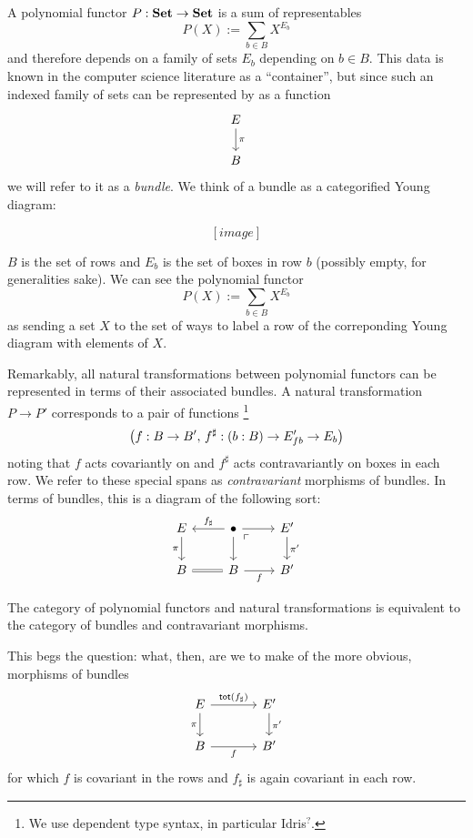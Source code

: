 
A polynomial functor $P : \operatorname{\textbf{Set}} \to \operatorname{\textbf{Set}}$ is a sum of representables
$$P(X) := \sum_{b \in B} X^{E_b}$$
and therefore depends on a family of sets $E_b$ depending on $b\in B$. This data is known
in the computer science literature as a ``container'', but since such an indexed
family of sets can be represented by as a function
\[
  \begin{tikzcd}
    E \arrow[d, "\pi"] \\
    B
  \end{tikzcd}
\]
we will refer to it as a \emph{bundle}. We think of a bundle as a categorified
Young diagram:

\[
[image]
\]

$B$ is the set of rows and $E_b$ is the set of boxes in row $b$ (possibly empty,
for generalities sake). We can see the polynomial functor
\begin{equation}\label{eqn.poly}
P(X) := \sum_{b \in B} X^{E_b}
\end{equation}
as sending a set $X$ to the set of ways to label a row of the correponding Young
diagram with elements of $X$.

Remarkably, all natural transformations between polynomial functors can be
represented in terms of their associated bundles. A natural transformation $P
\to P'$ corresponds to a pair of functions%
\footnote{We use dependent type syntax, in particular Idris$^?$.}
\[
\left( f : B \to B',\, f^{\sharp} : ({b : B}) \to E'_{fb} \to E_b \right)
\]
noting that $f$ acts covariantly on  and $f^\sharp$ acts contravariantly on
boxes in each row. We refer to these special spans as  \emph{contravariant} morphisms of bundles.
In terms of bundles, this is a diagram of the following sort:
\[
  \begin{tikzcd}
    E \arrow[d, "\pi"'] \arrow[r, leftarrow, "f_{\sharp}"] & \bullet \arrow[d] \arrow[r]
    \arrow[dr, phantom, "\ulcorner" very near start] & E' \arrow[d, "\pi'"] \\
    B \arrow[r, equals] & B \arrow[r, "f"'] & B'
  \end{tikzcd}
\]

\begin{thm}[cite]
The category of polynomial functors and natural transformations is equivalent to
the category of bundles and contravariant morphisms.
\end{thm}

This begs the question: what, then, are we to make of the more obvious,
\emph{} morphisms of bundles
\[
  \begin{tikzcd}[column sep=large]
E \arrow[r, "\term{tot}(f_{\sharp})"] \arrow[d, "\pi"'] & E' \arrow[d, "\pi'"] \\
B \arrow[r, "f"']                                       & B'                  
\end{tikzcd}
\]
for which $f$ is covariant in the rows and $f_\sharp$ is again covariant
in each row.

